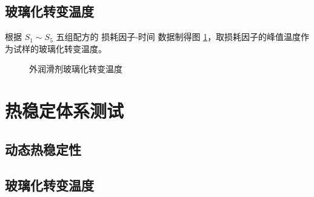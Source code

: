 \subsection{玻璃化转变温度}

根据 $S_1 \sim S_5$ 五组配方的 损耗因子-时间 数据制得图 \ref{fig2Tg}，取损耗因子的峰值温度作为试样的玻璃化转变温度。

\begin{figure}[!htb]
    \begin{center}
        
    \end{center}
    \caption{外润滑剂玻璃化转变温度}
    \label{fig2Tg}
\end{figure}

\section{热稳定体系测试}

\subsection{动态热稳定性}


\subsection{玻璃化转变温度}

